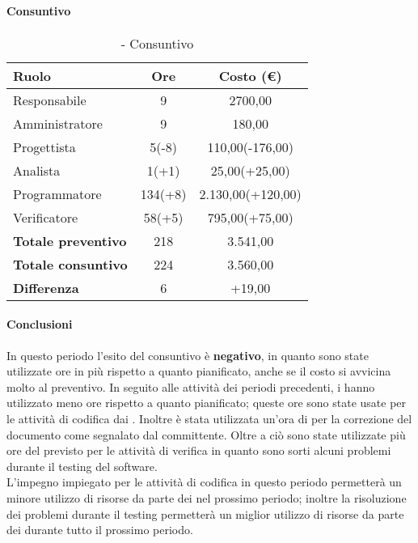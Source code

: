 \documentclass[./PianoDiProgetto.tex]{subfiles}
\begin{document}
\paragraph{Consuntivo}	
\begin{table}[H]
		\centering

		\begin{tabular}{l * {2}{c}}
			\toprule
			\textbf{Ruolo} & \textbf{Ore} & \textbf{Costo (\euro{})} \\
			\midrule
			Responsabile & 9    &  2700,00 \\
			Amministratore  & 9    &  180,00 \\
			Progettista  & 5(-8)   &  110,00(-176,00) \\
			Analista & 1(+1)    &  25,00(+25,00) \\
			Programmatore  & 134(+8)    &  2.130,00(+120,00) \\
			Verificatore  & 58(+5)    &  795,00(+75,00) \\
			\midrule
			\textbf{Totale preventivo}  & 218   &  3.541,00 \\
			\textbf{Totale consuntivo}  & 224   &  3.560,00 \\
			\midrule
			\textbf{Differenza}  & 6  &  +19,00 \\
			\bottomrule
		\end{tabular}
		\caption{\PerC{} - Consuntivo}
	\end{table}
	\paragraph{Conclusioni}
	In questo periodo l'esito del consuntivo è \textbf{negativo}, in quanto sono state utilizzate ore in più rispetto a quanto pianificato, anche se il costo si avvicina molto al preventivo. In seguito alle attività dei periodi precedenti, i \PJP{} hanno utilizzato meno ore rispetto a quanto pianificato; queste ore sono state usate per le attività di codifica dai \PRP{}. Inoltre è stata utilizzata un'ora di \AN{} per la correzione del documento \ARdoc{} come segnalato dal committente. Oltre a ciò sono state utilizzate più ore del previsto per le attività di verifica in quanto sono sorti alcuni problemi durante il testing del software.\\
L'impegno impiegato per le attività di codifica in questo periodo permetterà un minore utilizzo  di risorse da parte dei \PRP{} nel prossimo periodo; inoltre la risoluzione dei problemi durante il testing permetterà un miglior utilizzo di risorse da parte dei \VERP{} durante tutto il prossimo periodo.
\end{document}
